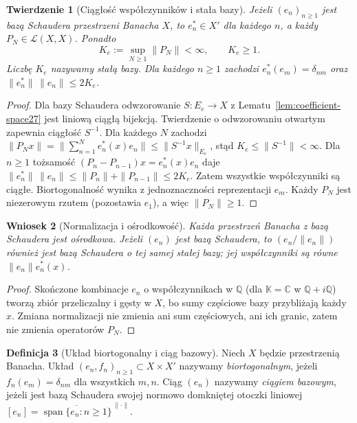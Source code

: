 \documentclass[11pt,a4paper]{article}
\numberwithin{equation}{section}
\theoremstyle{plain}
\newtheorem{twierdzenie}{Twierdzenie}[section]
\newtheorem{wniosek}[twierdzenie]{Wniosek}
\theoremstyle{definition}
\newtheorem{definicja}[twierdzenie]{Definicja}
\theoremstyle{remark}
\newcommand{\C}{\mathbb C}
\newcommand{\K}{\mathbb K}
\begin{document}
\begin{twierdzenie}[Ciągłość współczynników i stała bazy]
\label{thm:basis-continuity27}
Jeżeli $(e_n)_{n\ge1}$ jest bazą Schaudera przestrzeni
Banacha $X$, to $e_n^*\in X'$ dla każdego $n$, a każdy
$P_N\in\mathcal L(X,X)$. Ponadto
\[
K_e:=\sup_{N\ge1}\|P_N\|<\infty,\qquad K_e\ge1.
\]
Liczbę $K_e$ nazywamy \emph{stałą bazy}.
Dla każdego $n\ge1$ zachodzi $e_n^*(e_m)=\delta_{nm}$
oraz $\|e_n^*\|\,\|e_n\|\le2K_e$.
\end{twierdzenie}
\begin{proof}
Dla bazy Schaudera odwzorowanie $S:E_e\to X$
z Lematu~\ref{lem:coefficient-space27} jest liniową ciągłą
bijekcją. Twierdzenie o odwzorowaniu otwartym zapewnia
ciągłość $S^{-1}$. Dla każdego $N$ zachodzi
$\|P_Nx\|=\|\sum_{n=1}^Ne_n^*(x)e_n\|
\le\|S^{-1}x\|_{E_e}$,
stąd $K_e\le\|S^{-1}\|<\infty$.
Dla $n\ge1$ tożsamość
$(P_n-P_{n-1})x=e_n^*(x)e_n$
daje $\|e_n^*\|\,\|e_n\|\le\|P_n\|+\|P_{n-1}\|
\le2K_e$. Zatem wszystkie współczynniki są ciągłe.
Biortogonalność wynika z jednoznaczności reprezentacji $e_m$.
Każdy $P_N$ jest niezerowym rzutem (pozostawia $e_1$),
a więc $\|P_N\|\ge1$.
\end{proof}

\begin{wniosek}[Normalizacja i ośrodkowość]
\label{cor:separable27}
Każda przestrzeń Banacha z bazą Schaudera jest ośrodkowa.
Jeżeli $(e_n)$ jest bazą Schaudera, to
$(e_n/\|e_n\|)$ również jest bazą Schaudera o tej samej stałej
bazy; jej współczynniki są równe $\|e_n\|e_n^*(x)$.
\end{wniosek}
\begin{proof}
Skończone kombinacje $e_n$ o współczynnikach w $\mathbb Q$
(dla $\K=\C$ w $\mathbb Q+i\mathbb Q$) tworzą zbiór przeliczalny
i gęsty w $X$, bo sumy częściowe bazy przybliżają każdy $x$.
Zmiana normalizacji nie zmienia ani sum częściowych,
ani ich granic, zatem nie zmienia operatorów $P_N$.
\end{proof}

\begin{definicja}[Układ biortogonalny i ciąg bazowy]
\label{def:biorthogonal27}
Niech $X$ będzie przestrzenią Banacha.
Układ $(e_n,f_n)_{n\ge1}\subset X\times X'$ nazywamy
\emph{biortogonalnym}, jeżeli $f_n(e_m)=\delta_{nm}$
dla wszystkich $m,n$. Ciąg $(e_n)$ nazywamy
\emph{ciągiem bazowym}, jeżeli jest bazą Schaudera swojej
normowo domkniętej otoczki liniowej $[e_n]
=\overline{\operatorname{span}\{e_n:n\ge1\}}^{\,\|\cdot\|}$.
\end{definicja}
\end{document}
